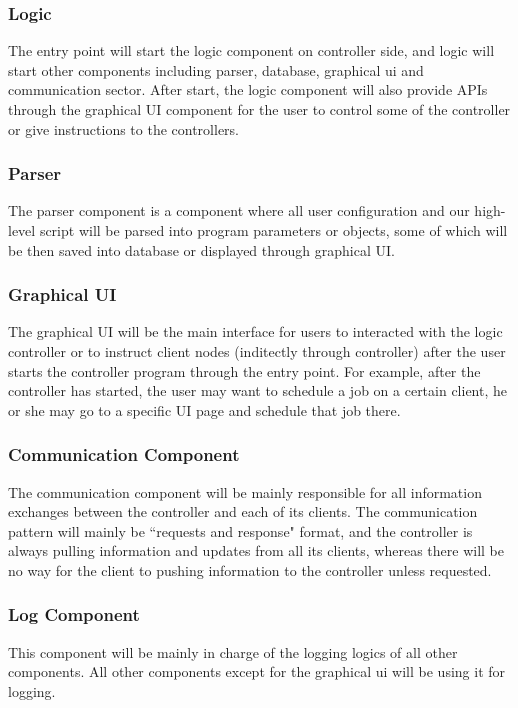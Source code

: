 \documentclass[12pt]{report}
\begin{document}
\subsubsection{Logic}
The entry point will start the logic component on controller side, and logic will start other components including parser, database, graphical ui and communication sector. After start, the logic component will also provide APIs through the graphical UI component for the user to control some of the controller or give instructions to the controllers.

\subsubsection{Parser}
The parser component is a component where all user configuration and our high-level script will be parsed into program parameters or objects, some of which will be then saved into database or displayed through graphical UI.

\subsubsection{Graphical UI}
The graphical UI will be the main interface for users to interacted with the logic controller or to instruct client nodes (inditectly through controller) after the user starts the controller program through the entry point. For example, after the controller has started, the user may want to schedule a job on a certain client, he or she may go to a specific UI page and schedule that job there.

\subsubsection{Communication Component}
The communication component will be mainly responsible for all information exchanges between the controller and each of its clients. The communication pattern will mainly be ``requests and response" format, and the controller is always pulling information and updates from all its clients, whereas there will be no way for the client to pushing information to the controller unless requested.

\subsubsection{Log Component}
This component will be mainly in charge of the logging logics of all other components. All other components except for the graphical ui will be using it for logging.
\end{document}
